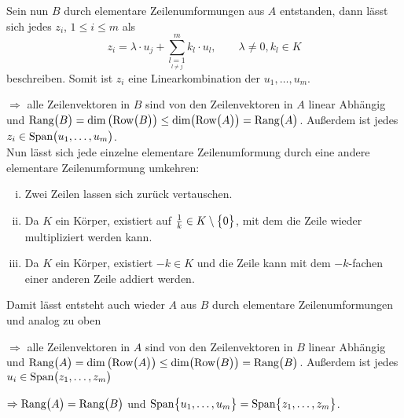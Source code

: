\documentclass{scrreprt}
\begin{document}
\noindent
Sein nun $B$ durch elementare Zeilenumformungen aus $A$ entstanden, dann lässt
sich jedes $z_i$, $1 \leq i \leq m$ als
\[
  z_i = \lambda \cdot u_j + \sum_{\underset{l \ne j}{l = 1}}^m k_l \cdot u_l,
  \qquad
  \lambda \ne 0, k_l \in K
\]
beschreiben.
Somit ist $z_i$ eine Linearkombination der $u_1, \ldots, u_m$.

$\Rightarrow$ alle Zeilenvektoren in $B$ sind von den Zeilenvektoren in $A$
linear Abhängig und $\text{Rang}\qty\big(B) = \dim\qty(\text{Row}\qty\big(B))
\leq \text{dim}\qty(\text{Row}\qty\big(A)) = \text{Rang}\qty\big(A)$.
Außerdem ist jedes $z_i \in \text{Span}\qty\big(u_1, \ldots, u_m)$.
\\

\noindent
Nun lässt sich jede einzelne elementare Zeilenumformung durch eine andere
elementare Zeilenumformung umkehren:
\begin{enumerate}[(i)]
\item Zwei Zeilen lassen sich zurück vertauschen.
\item Da $K$ ein Körper, existiert auf $\frac{1}{k} \in K \setminus \qty\big{0}$,
  mit dem die Zeile wieder multipliziert werden kann.
\item Da $K$ ein Körper, existiert $-k \in K$ und die Zeile kann mit dem
  $-k$-fachen einer anderen Zeile addiert werden.
\end{enumerate}
Damit lässt entsteht auch wieder $A$ aus $B$ durch elementare Zeilenumformungen
und analog zu oben

$\Rightarrow$ alle Zeilenvektoren in $A$ sind von den Zeilenvektoren in $B$
linear Abhängig und $\text{Rang}\qty\big(A) = \dim\qty(\text{Row}\qty\big(A))
\leq \text{dim}\qty(\text{Row}\qty\big(B)) = \text{Rang}\qty\big(B)$.
Außerdem ist jedes $u_i \in \text{Span}\qty\big(z_1, \ldots, z_m)$

$\Rightarrow \text{Rang}\qty\big(A) = \text{Rang}\qty\big(B)$ und
$\text{Span}\qty\big{u_1, \ldots, u_m} = \text{Span}\qty\big{z_1, \ldots, z_m}$.
\end{document}
